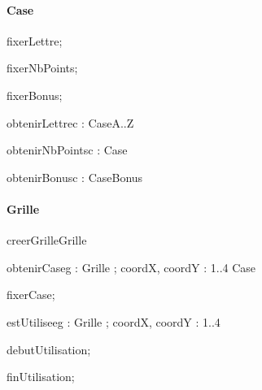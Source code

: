 \paragraph{Case}
\begin{algorithme}
  \signatureprocedure
  {fixerLettre}{; }

  \signatureprocedure
  {fixerNbPoints}{; }

  \signatureprocedure
  {fixerBonus}{; }

  \signaturefonction
  {obtenirLettre}{c : Case}{A..Z}

  \signaturefonction
  {obtenirNbPoints}{c : Case}{\naturelNonNul}

  \signaturefonction
  {obtenirBonus}{c : Case}{Bonus}

\end{algorithme}

\paragraph{Grille}
\begin{algorithme}
  \signaturefonction
  {creerGrille}{}{Grille}

  \signaturefonction
  {obtenirCase}{g : Grille ; coordX, coordY : 1..4 }{Case}

  \signatureprocedure
  {fixerCase}{; }

  \signaturefonction
  {estUtilisee}{g : Grille ; coordX, coordY : 1..4}{\booleen}

  \signatureprocedure
  {debutUtilisation}{; }

  \signatureprocedure
  {finUtilisation}{; }

\end{algorithme}
